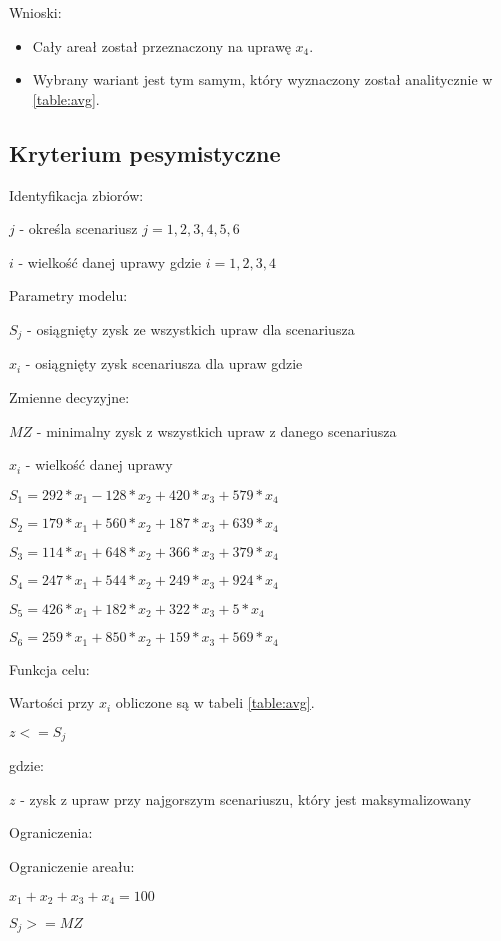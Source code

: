 \documentclass{article}
\begin{document}
\noindent
Wnioski:

\begin{itemize}
	\item Cały areał został przeznaczony na uprawę $x_4$.
	\item Wybrany wariant jest tym samym, który wyznaczony został analitycznie w \ref{table:avg}.
\end{itemize}

\subsection{Kryterium pesymistyczne}

\noindent
Identyfikacja zbiorów:

$j$ - określa scenariusz $j = {1,2,3,4,5,6}$

$i$ - wielkość danej uprawy gdzie $i = {1,2,3,4}$

\noindent
Parametry modelu:

$S_j$ - osiągnięty zysk ze wszystkich upraw dla scenariusza

$x_i$ - osiągnięty zysk scenariusza dla upraw gdzie

\noindent
Zmienne decyzyjne:

$MZ$ - minimalny zysk z wszystkich upraw z danego scenariusza

$x_i$ - wielkość danej uprawy

$S_1 = 292 * x_1 - 128 * x_2 + 420 * x_3 + 579 * x_4$

$S_2 = 179 * x_1 + 560 * x_2 + 187 * x_3 + 639 * x_4$

$S_3 = 114 * x_1 + 648 * x_2 + 366 * x_3 + 379 * x_4$

$S_4 = 247 * x_1 + 544 * x_2 + 249 * x_3 + 924 * x_4$

$S_5 = 426 * x_1 + 182 * x_2 + 322 * x_3 + 5 * x_4$

$S_6 = 259 * x_1 + 850 * x_2 + 159 * x_3 + 569 * x_4$


\noindent
Funkcja celu:

Wartości przy $x_i$ obliczone są w tabeli \ref{table:avg}.

$z <= S_j$ 

gdzie:

$z$ - zysk z upraw przy najgorszym scenariuszu, który jest maksymalizowany

\noindent
Ograniczenia:

\noindent
Ograniczenie areału:

$x_1 + x_2 + x_3 + x_4 = 100$

$S_j >= MZ$
\end{document}

